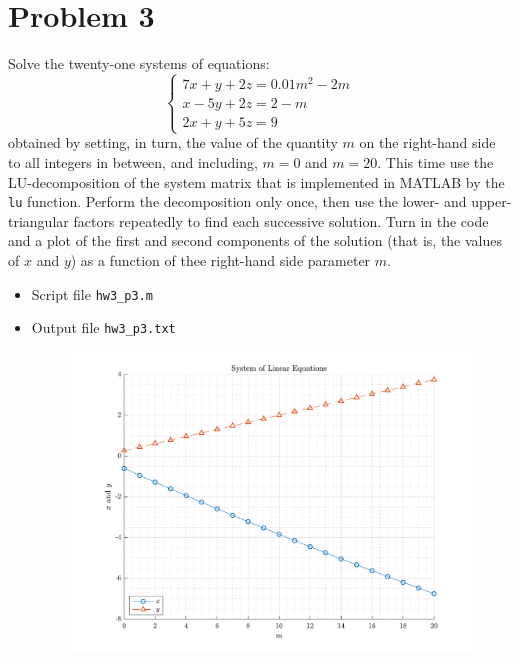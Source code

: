 \section{Problem 3}%
\label{sec:problem_3}
Solve the twenty-one systems of equations:
\begin{equation*}
  \begin{cases}
    7x + y + 2z = 0.01 m^{2} - 2m \\
    x - 5y + 2z = 2 - m \\
    2x + y + 5z = 9
  \end{cases}
\end{equation*}
obtained by setting, in turn, the value of the quantity $m$ on the right-hand side to all integers in between, and including, $m = 0$ and $m = 20$. This time use the LU-decomposition of the system matrix that is implemented in MATLAB by the \verb|lu| function. Perform the decomposition only once, then use the lower- and upper-triangular factors repeatedly to find each successive solution. Turn in the code and a plot of the first and second components of the solution (that is, the values of $x$ and $y$) as a function of thee right-hand side parameter $m$.
\begin{solution}
  \quad
  \begin{itemize}
    \item
      Script file \verb|hw3_p3.m|
      
    \item
      Output file \verb|hw3_p3.txt|
      
      \begin{figure}[!hbtp]
        \centering
        \includegraphics[width=0.8\linewidth]{../src/hw3_p3.pdf}
        \caption{}%
        \label{fig:}
      \end{figure}
  \end{itemize}
\end{solution}

